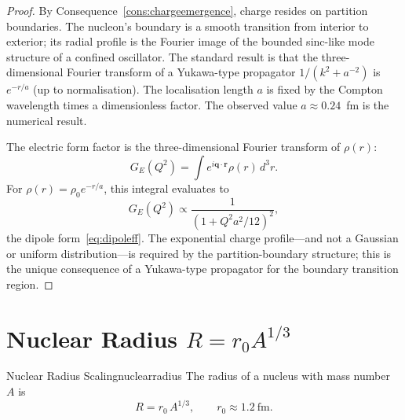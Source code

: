 \begin{proof}
By Consequence~\ref{cons:chargeemergence}, charge resides on partition
boundaries.  The nucleon's boundary is a smooth transition from interior to
exterior; its radial profile is the Fourier image of the bounded sinc-like
mode structure of a confined oscillator.  The standard result
\citep[Ch.~4]{arfkenweber2005} is that the three-dimensional Fourier transform
of a Yukawa-type propagator $1/(k^{2}+a^{-2})$ is $e^{-r/a}$ (up to
normalisation).  The localisation length $a$ is fixed by the Compton
wavelength times a dimensionless factor.  The observed value
$a\approx 0.24$~fm \citep{hofstadtermcallister1955,hofstadter1956} is the
numerical result.

The electric form factor is the three-dimensional Fourier transform of $\rho(r)$:
\[
  G_{E}(Q^{2}) = \int e^{i\mathbf{q}\cdot\mathbf{r}}\rho(r)\,d^{3}r.
\]
For $\rho(r)=\rho_{0}e^{-r/a}$, this integral evaluates to
\[
  G_{E}(Q^{2}) \propto \frac{1}{(1+Q^{2}a^{2}/12)^{2}},
\]
the dipole form~\eqref{eq:dipoleff}.  The exponential charge profile---and
not a Gaussian or uniform distribution---is required by the partition-boundary
structure; this is the unique consequence of a Yukawa-type propagator for the
boundary transition region.
\end{proof}

\section{Nuclear Radius $R=r_{0}A^{1/3}$}
\label{sec:nuclearradius}

\begin{consequence}{Nuclear Radius Scaling}{nuclearradius}
The radius of a nucleus with mass number $A$ is
\begin{equation}
  R = r_{0}\,A^{1/3}, \qquad r_{0}\approx 1.2\ \mathrm{fm}.
  \label{eq:Arootthree}
\end{equation}
\end{consequence}

